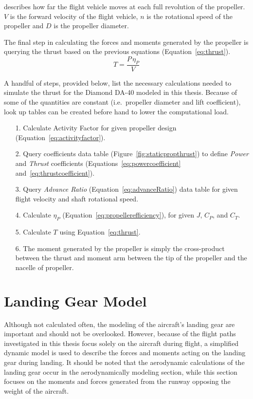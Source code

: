 describes how far the flight vehicle moves at each full revolution of the propeller.
\(V\) is the forward velocity of the flight vehicle, \(n\) is the rotational speed of the propeller and \(D\) is the propeller diameter.

The final step in calculating the forces and moments generated by the propeller is querying the thrust based on the previous equations (Equation~\ref{eq:thrust}).
\begin{equation}\label{eq:thrust}
    T = \frac{P \, \eta_P}{V}
\end{equation}

A handful of steps, provided below, list the necessary calculations needed to simulate the thrust for the Diamond DA-40 modeled in this thesis. Because of some of the quantities are constant (i.e.\ propeller diameter and lift coefficient), look up tables can be created before hand to lower the computational load.

\begin{itemize}
    \item[1.] Calculate Activity Factor for given propeller design (Equation~\ref{eq:activityfactor}).
    \item[2.] Query coefficients data table (Figure~\ref{fig:staticpropthrust}) to define \textit{Power} and \textit{Thrust} coefficients (Equations~\ref{eq:powercoefficient} and~\ref{eq:thrustcoefficient}).
    \item[3.] Query \textit{Advance Ratio} (Equation~\ref{eq:advanceRatio}) data table for given flight velocity and shaft rotational speed.
    \item[4.] Calculate \( \eta_P \) (Equation~\ref{eq:propellerefficiency}), for given \(J\), \(C_P\), and \(C_T\).
    \item[5.] Calculate \(T\) using Equation~\ref{eq:thrust}.
    \item[6.] The moment generated by the propeller is simply the cross-product between the thrust and moment arm between the tip of the propeller and the nacelle of propeller.
\end{itemize}

\section{\textbf{Landing Gear Model}}
Although not calculated often, the modeling of the aircraft's landing gear are important and should not be overlooked. However, because of the flight paths investigated in this thesis focus solely on the aircraft during flight, a simplified dynamic model is used to describe the forces and moments acting on the landing gear during landing. It should be noted that the aerodynamic calculations of the landing gear occur in the aerodynamically modeling section, while this section focuses on the moments and forces generated from the runway opposing the weight of the aircraft.

